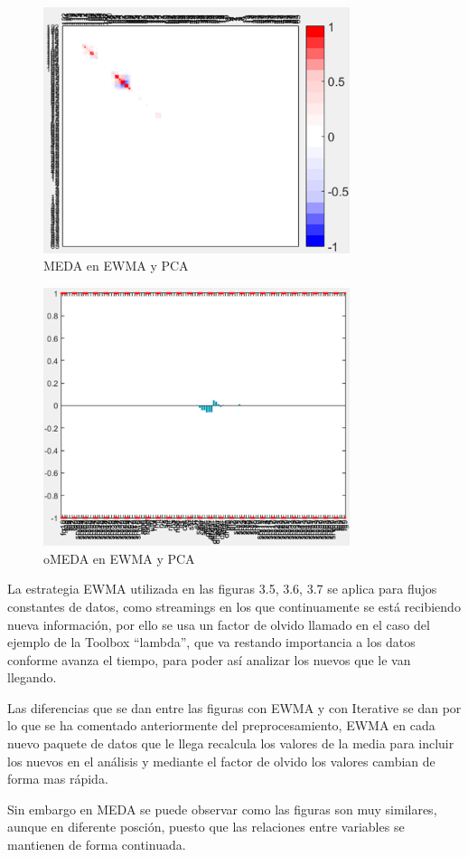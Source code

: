 \begin{figure}[H]
\centering
\includegraphics[width=0.8\textwidth]{imagenes/figuras/3_6.png}
\caption{MEDA en EWMA y PCA}
\end{figure}


\begin{figure}[H]
\centering
\includegraphics[width=0.8\textwidth]{imagenes/figuras/3_7.png}
\caption{oMEDA en EWMA y PCA}
\end{figure}


La estrategia EWMA utilizada en las figuras 3.5, 3.6, 3.7 se aplica para flujos constantes de datos, como streamings en los que continuamente se está recibiendo nueva información, por ello se usa un factor de olvido llamado en el caso del ejemplo de la Toolbox “lambda”, que va restando importancia a los datos conforme avanza el tiempo, para poder así analizar los nuevos que le van llegando.
\bigskip

Las diferencias que se dan entre las figuras con EWMA y con Iterative se dan por lo que se ha comentado anteriormente del preprocesamiento, EWMA en cada nuevo paquete de datos que le llega recalcula los valores de la media para incluir los nuevos en el análisis y mediante el factor de olvido los valores cambian de forma mas rápida.

\bigskip

Sin embargo en MEDA se puede observar como las figuras son muy similares, aunque en diferente posción, puesto que las relaciones entre variables se mantienen de forma continuada.

